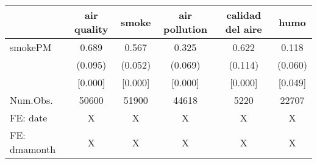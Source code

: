 \begin{table}
\centering
\begin{tabular}[t]{lccccc}
\toprule
  & air quality & smoke & air pollution & calidad del aire & humo\\
\midrule
smokePM & 0.689 & 0.567 & 0.325 & 0.622 & 0.118\\
 & (0.095) & (0.052) & (0.069) & (0.114) & (0.060)\\
 & {}[0.000] & {}[0.000] & {}[0.000] & {}[0.000] & {}[0.049]\\
\midrule
Num.Obs. & 50600 & 51900 & 44618 & 5220 & 22707\\
FE: date & X & X & X & X & X\\
FE: dmamonth & X & X & X & X & X\\
\bottomrule
\end{tabular}
\end{table}
